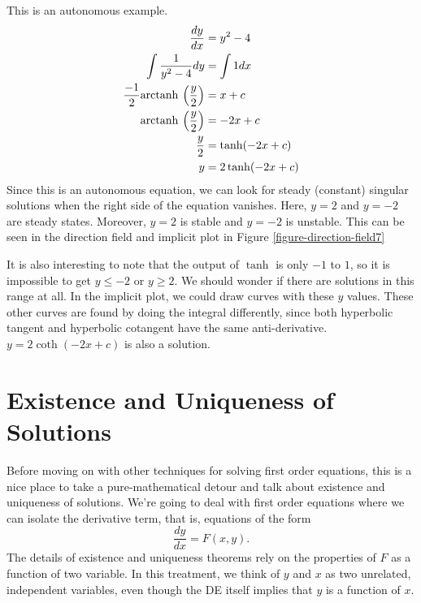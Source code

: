 \documentclass[fleqn,letterpaper]{report}
\begin{document}
\begin{example}
This is an autonomous example.
\begin{align*}
\frac{dy}{dx} & = y^2 - 4 \\
\int \frac{1}{y^2-4} dy & = \int 1 dx \\
\frac{-1}{2} \mathrm{arctanh\hspace{0.07cm}} \left( \frac{y}{2} \right) & = x + c \\
\mathrm{arctanh\hspace{0.07cm}} \left( \frac{y}{2} \right) & = -2x + c \\
\frac{y}{2} & = \tanh (-2x + c) \\
y & = 2 \tanh (-2x + c) \\
\end{align*}
Since this is an autonomous equation, we can look for steady
(constant) singular solutions when the right side of the
equation vanishes. Here, $y=2$ and $y=-2$ are steady states.
Moreover, $y=2$ is stable and $y=-2$ is unstable.
This can be seen in the direction field and implicit plot in
Figure \ref{figure-direction-field7} 

It is also interesting to note that the
output of $\tanh$ is only $-1$ to $1$, so it is 
impossible to get $y \leq -2$ or $y \geq 2$. We should
wonder if there are solutions in this range at all. In the
implicit plot, we could draw curves with these $y$ values.
These other curves are found by doing the integral
differently, since both hyperbolic tangent and hyperbolic
cotangent have the same anti-derivative. $y=2 \coth (-2x +
c)$ is also a solution.
\end{example}

\section{Existence and Uniqueness of Solutions}
\label{existence-and-uniqueness}

Before moving on with other techniques for solving first order
equations, this is a nice place to take a pure-mathematical
detour and talk about existence and uniqueness of solutions.
We're going to deal with first order equations where we can
isolate the derivative term, that is, equations of the form
\begin{equation*}
\frac{dy}{dx} = F(x,y).
\end{equation*}
The details of existence and uniqueness theorems rely on the
properties of $F$ as a function of two variable. In this
treatment, we think of $y$ and $x$ as two unrelated,
independent variables, even though the DE itself implies that
$y$ is a function of $x$.
\end{document}
